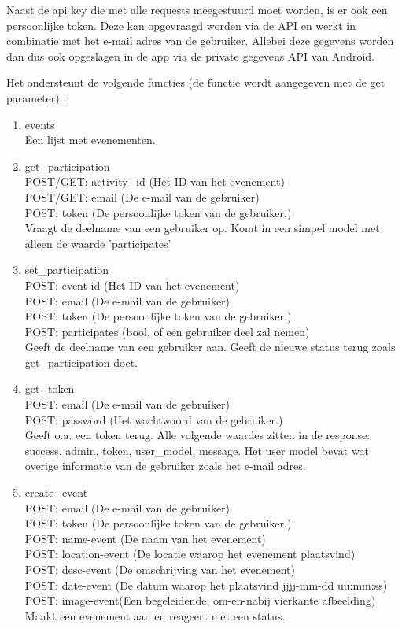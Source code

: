 \documentclass[dutch]{report}
\begin{document}
	Naast de api key die met alle requests meegestuurd moet worden, is er ook een persoonlijke token. Deze
	kan opgevraagd worden via de API en werkt in combinatie met het e-mail adres van de gebruiker. Allebei
	deze gegevens worden dan dus ook opgeslagen in de app via de private gegevens API van Android. 
	
	Het ondersteunt de volgende functies (de functie wordt aangegeven met de get parameter) :
	\begin{enumerate}
		\item events\\
		Een lijst met evenementen. 
		
		\item get\_participation\\
		POST/GET: activity\_id (Het ID van het evenement)\\
		POST/GET: email (De e-mail van de gebruiker)\\
		POST: token (De persoonlijke token van de gebruiker.)\\
		Vraagt de deelname van een gebruiker op. Komt in een simpel model met alleen de waarde 'participates' 
		
		\item set\_participation\\
		POST: event-id (Het ID van het evenement)\\
		POST: email (De e-mail van de gebruiker)\\
		POST: token (De persoonlijke token van de gebruiker.)\\
		POST: participates (bool, of een gebruiker deel zal nemen)\\
		Geeft de deelname van een gebruiker aan. Geeft de nieuwe status terug zoals get\_participation doet. 
		
		\item get\_token\\
		POST: email (De e-mail van de gebruiker)\\
		POST: password (Het wachtwoord van de gebruiker.)\\
		Geeft o.a. een token terug. Alle volgende waardes zitten in de response: success, admin, token, 
		user\_model, message. Het user model bevat wat overige informatie van de gebruiker zoals het e-mail adres.
		
		\item create\_event\\
		POST: email (De e-mail van de gebruiker)\\
		POST: token (De persoonlijke token van de gebruiker.)\\
		POST: name-event (De naam van het evenement)\\
		POST: location-event (De locatie waarop het evenement plaatsvind)\\
		POST: desc-event (De omschrijving van het evenement)\\
		POST: date-event (De datum waarop het plaatsvind jjjj-mm-dd uu:mm:ss)\\
		POST: image-event(Een begeleidende, om-en-nabij vierkante afbeelding)\\
		Maakt een evenement aan en reageert met een status. 
		
	\end{enumerate}
\end{document}
